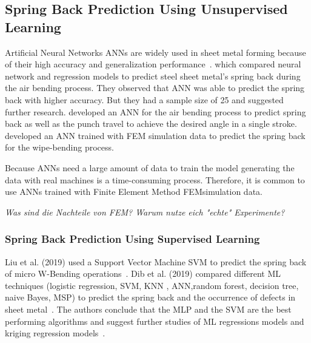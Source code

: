 \subsection*{Spring Back Prediction Using Unsupervised Learning}
Artificial Neural Networks \ac{ANN}s are widely used in sheet metal forming because of
their high accuracy and generalization performance~\cite[p. 2]{cruz_applicationmachinelearning_2021}.
\cite[]{narayanasamy_comparisonregressionartificial_2012a}
which compared neural network and regression models to predict steel sheet metal's spring back during the air bending
process.
They observed that ANN was able to predict the spring back with higher accuracy.
But they had a sample size of 25 and suggested further research.
\cite[]{inamdar_developmentartificialneural_2000} developed an ANN for the air bending
process to predict spring back as well as the punch travel to achieve the desired angle in a single stroke.
\cite[]{kazan_predictionspringbackwipebending_2009} developed an ANN trained with FEM
simulation data to predict the spring back for the wipe-bending process.

Because \ac{ANN}s need a large amount of data to train the model generating the data
with real
machines is a time-consuming process.
Therefore, it is common to use \ac{ANN}s trained with Finite Element Method \ac{FEM}simulation data.

\textit{Was sind die Nachteile von FEM? Warum nutze eich "echte" Experimente?}
\subsubsection*{Spring Back Prediction Using Supervised Learning}
Liu et al. (2019) used a Support Vector Machine \ac{SVM} to predict the spring back of
micro W-Bending operations~\cite{liu_springbackpredictionforming_2019}.
Dib et al. (2019) compared different \ac{ML} techniques (logistic regression, SVM, KNN
, ANN,random forest, decision tree, naive Bayes, MSP) to predict the spring back and the occurrence of
defects in sheet metal~\cite[p. 1]{dib_singleensembleclassifiers_2020}.
The authors conclude that the MLP and the SVM are the best performing algorithms and
suggest further studies of ML regressions models and kriging regression
models~\cite[p. 13]{dib_singleensembleclassifiers_2020}.

